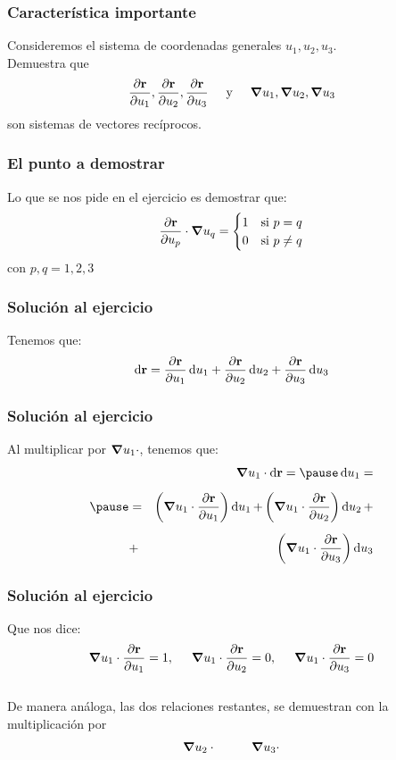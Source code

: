 \documentclass[12pt]{beamer}
\begin{document}
\begin{frame}
\frametitle{Característica importante}
Consideremos el sistema de coordenadas generales $u_{1}, u_{2}, u_{3}$.
\\
\bigskip
Demuestra que
\begin{align*}
\pdv{\vb{r}}{u_{1}}, \pdv{\vb{r}}{u_{2}}, \pdv{\vb{r}}{u_{3}} \hspace{0.5cm} \mbox{y} \hspace{0.5cm} \grad{u_{1}}, \grad{u_{2}}, \grad{u_{3}}  
\end{align*}
son sistemas de vectores recíprocos.
\end{frame}
\begin{frame}
\frametitle{El punto a demostrar}
Lo que se nos pide en el ejercicio es demostrar que:
\begin{align*}
\pdv{\vb{r}}{u_{p}} \cdot \grad{u_{q}} = \begin{cases}
1 & \mbox{si } p = q \\
0 & \mbox{si } p \neq q
\end{cases}
\end{align*}
con $p, q = 1, 2, 3$
\end{frame}
\begin{frame}
\frametitle{Solución al ejercicio}
Tenemos que:
\begin{align*}
\dd{\vb{r}} = \pdv{\vb{r}}{u_{1}} \dd{u_{1}} + \pdv{\vb{r}}{u_{2}} \dd{u_{2}} + \pdv{\vb{r}}{u_{3}} \dd{u_{3}}
\end{align*}
\end{frame}
\begin{frame}
\frametitle{Solución al ejercicio}
Al multiplicar por $\grad{u_{1}} \cdot$, \pause tenemos que:
\begin{eqnarray*}
&{}& \grad{u_{1}} \cdot \dd{\vb{r}} = \pause \dd{u_{1}} = \\[0.5em] \pause
&=& \left( \grad{u_{1}} \cdot \pdv{\vb{r}}{u_{1}} \right) \dd{u_{1}} {+} \left( \grad{u_{1}} \cdot \pdv{\vb{r}}{u_{2}} \right) \dd{u_{2}} {+} \\[0.5em]
&+& \left( \grad{u_{1}} \cdot \pdv{\vb{r}}{u_{3}} \right) \dd{u_{3}}
\end{eqnarray*}
\end{frame}
\begin{frame}
\frametitle{Solución al ejercicio}
Que nos dice: \pause
\begin{align*}
\grad{u_{1}} \cdot \pdv{\vb{r}}{u_{1}} = 1, \hspace{0.5cm} \grad{u_{1}} \cdot \pdv{\vb{r}}{u_{2}} = 0, \hspace{0.5cm} \grad{u_{1}} \cdot \pdv{\vb{r}}{u_{3}}  = 0
\end{align*}
\pause
\\
\bigskip
De manera análoga, las dos relaciones restantes, se demuestran con la multiplicación por
\begin{align*}
\grad{u_{2}} \cdot \hspace{1cm} \grad{u_{3}} \cdot
\end{align*}
\end{frame}
\end{document}
